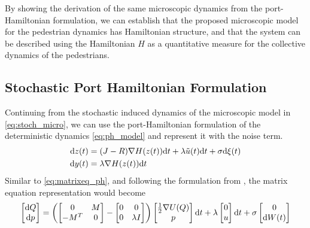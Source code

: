 By showing the derivation of the same microscopic dynamics from the port-Hamiltonian formulation, we can establish that the proposed microscopic model for the pedestrian dynamics has Hamiltonian structure, and that the system can be described using the Hamiltonian $H$ as a quantitative measure for the collective dynamics of the pedestrians.

\subsection{Stochastic Port Hamiltonian Formulation}
Continuing from the stochastic induced dynamics of the microscopic model in \autoref{eq:stoch_micro}, we can use the port-Hamiltonian formulation of the deterministic dynamics \autoref{eq:ph_model} and represent it with the noise term.
\begin{equation}
    \begin{aligned}
        \mathrm d z(t) &= (J-R)\nabla H(z(t))\mathrm d t + \lambda \tilde u(t)\mathrm d t + \sigma \mathrm d \xi(t)\\
        \mathrm d y(t) &= \lambda \nabla H(z(t))\mathrm d t
    \end{aligned}
    \label{eq:stoch_ph_model}
\end{equation}
Similar to \autoref{eq:matrixeq_ph}, and following the formulation from \cite{rudiger2024stability}, the matrix equation representation would become
\begin{gather}
    \begin{bmatrix}
        \mathrm d Q \\ \mathrm d p
    \end{bmatrix} =
    \left(
    \begin{bmatrix}
        0 & M \\ 
        -M^T & 0
    \end{bmatrix} -
    \begin{bmatrix}
        0 & 0 \\
        0 & \lambda I
    \end{bmatrix} \right)
    \begin{bmatrix}
        \frac{1}{2} \nabla U(Q) \\
        p 
    \end{bmatrix}\mathrm d t
    + \lambda 
    \begin{bmatrix}
        0 \\ u
    \end{bmatrix}\mathrm d t
    + \sigma
    \begin{bmatrix}
        0 \\ \mathrm d W(t)
    \end{bmatrix}
    \label{eq:matrix_stoc_eq_ph}
\end{gather}

